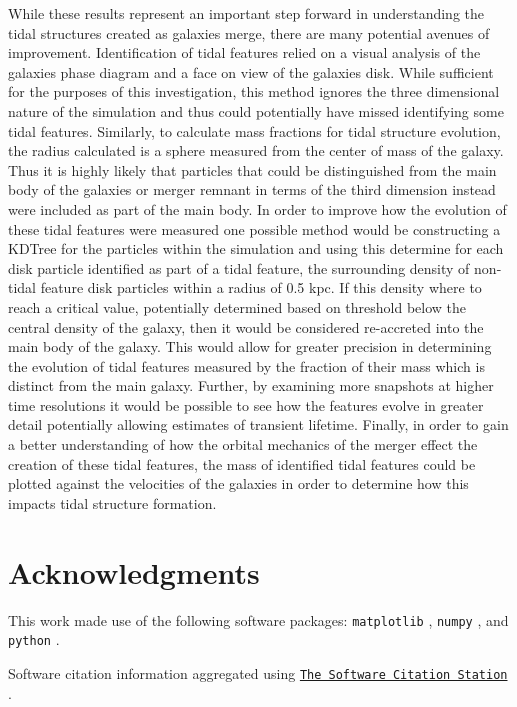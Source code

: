 \documentclass[fleqn,usenatbib]{mnras}
\begin{document}
While these results represent an important step forward in understanding the tidal structures created as galaxies merge, there are many potential avenues of improvement. Identification of tidal features relied on a visual analysis of the galaxies phase diagram and a face on view of the galaxies disk. While sufficient for the purposes of this investigation, this method ignores the three dimensional nature of the simulation and thus could potentially have missed identifying some tidal features. Similarly, to calculate mass fractions for tidal structure evolution, the radius calculated is a sphere measured from the center of mass of the galaxy. Thus it is highly likely that particles that could be distinguished from the main body of the galaxies or merger remnant in terms of the third dimension instead were included as part of the main body. In order to improve how the evolution of these tidal features were measured one possible method would be constructing a KDTree for the particles within the simulation and using this determine for each disk particle identified as part of a tidal feature, the surrounding density of non-tidal feature disk particles within a radius of 0.5 kpc. If this density where to reach a critical value, potentially determined based on threshold below the central density of the galaxy, then it would be considered re-accreted into the main body of the galaxy. This would allow for greater precision in determining the evolution of tidal features measured by the fraction of their mass which is distinct from the main galaxy. Further, by examining more snapshots at higher time resolutions it would be possible to see how the features evolve in greater detail potentially allowing estimates of transient lifetime. Finally, in order to gain a better understanding of how the orbital mechanics of the merger effect the creation of these tidal features, the mass of identified tidal features could be plotted against the velocities of the galaxies in order to determine how this impacts tidal structure formation.

\section*{Acknowledgments}
This work made use of the following software packages: \texttt{matplotlib} \citep{Hunter:2007}, \texttt{numpy} \citep{numpy}, and \texttt{python} \citep{python}.

Software citation information aggregated using \texttt{\href{https://www.tomwagg.com/software-citation-station/}{The Software Citation Station}} \citep{software-citation-station-paper, software-citation-station-zenodo}.
\end{document}
